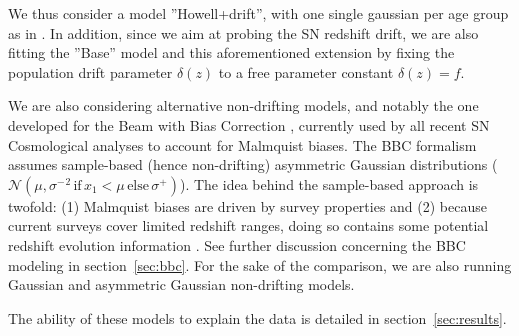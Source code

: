 \documentclass[]{aa} %
\newcommand{\nn}[1]{{\textcolor[rgb]{1, 0.27, 0}{#1}}}
\begin{document}

\nn{We thus consider a model ''Howell+drift'', with one single gaussian per age
group as in \citet{howell2007}}. In addition, since we aim at probing the SN
redshift drift, we are also fitting the ''Base'' model and \nn{this
aforementioned extension} by fixing the population drift parameter $\delta(z)$
to a free parameter constant $\delta(z)=f$. 

We are also considering alternative non-drifting models, and notably the one
developed for the Beam with Bias Correction \cite[BBC,][]{scolnic2016,
kessler2017}, currently used by all recent SN Cosmological analyses
\cite[e.g.][]{scolnic2018a, descosmopaper2019, riess2016, riess2019} to account
for Malmquist biases. The BBC formalism assumes sample-based (hence
non-drifting) asymmetric Gaussian distributions ($\mathcal{N}\left(\mu,
\sigma^{-}{}^2\, \mathrm{if}\,x_1<\mu\,\mathrm{else}\, \sigma^{+}\right)$). The
idea behind the sample-based approach is twofold: (1) Malmquist biases are
driven by survey properties and (2) because current surveys cover limited
redshift ranges, doing so contains some potential redshift evolution information
\citep{scolnic2016, scolnic2018a}. See further discussion concerning the BBC
modeling in section~\ref{sec:bbc}. For the sake of the comparison, we are also
running Gaussian and asymmetric Gaussian non-drifting models. 

The ability of these models to explain the data is detailed in
section~\ref{sec:results}.
\end{document}

